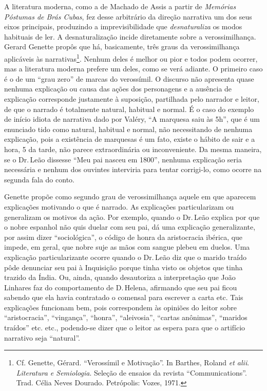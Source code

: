 A literatura moderna, como a de Machado de Assis a partir de
\emph{Memórias Póstumas de Brás Cubas}, fez desse arbitrário da direção
narrativa um dos seus eixos principais, produzindo a imprevisibilidade
que \emph{desnaturaliza} os modos habituais de ler. A desnaturalização
incide diretamente sobre a verossimilhança. Gerard Genette propôs que
há, basicamente, três graus da verossimilhança aplicáveis às
narrativas\footnote{Cf. Genette, Gérard. ``Verossímil e Motivação''. In
  Barthes, Roland \emph{et alii}. \emph{Literatura e Semiologia}.
  Seleção de ensaios da revista ``Communications''. Trad. Célia Neves
  Dourado. Petrópolis: Vozes, 1971.}. Nenhum deles é melhor ou pior e
todos podem ocorrer, mas a literatura moderna prefere um deles, como se
verá adiante. O primeiro caso é o de um ``grau zero'' de marcas do
verossímil. O discurso não apresenta quase nenhuma explicação ou causa
das ações dos personagens e a ausência de explicação corresponde
justamente à suposição, partilhada pelo narrador e leitor, de que o
narrado é totalmente natural, habitual e normal. É o caso do exemplo de
início idiota de narrativa dado por Valéry, ``A marquesa saiu às 5h'',
que é um enunciado tido como natural, habitual e normal, não
necessitando de nenhuma explicação, pois a existência de marquesas é um
fato, existe o hábito de sair e a hora, 5 da tarde, não parece
extraordinária ou inconveniente. Da mesma maneira, se o Dr.\,Leão
dissesse ``Meu pai nasceu em 1800'', nenhuma explicação seria necessária e
nenhum dos ouvintes interviria para tentar corrigi-lo, como ocorre na
segunda fala do conto.

Genette propõe como segundo grau de verossimilhança aquele em que
aparecem explicações motivando o que é narrado. As explicações
particularizam ou generalizam os motivos da ação. Por exemplo, quando o
Dr.\,Leão explica por que o nobre espanhol não quis duelar com seu pai,
dá uma explicação generalizante, por assim dizer ``sociológica'', o
código de honra da aristocracia ibérica, que impede, em geral, que nobre
suje as mãos com sangue plebeu em duelos. Uma explicação
particularizante ocorre quando o Dr.\,Leão diz que o marido traído pôde
denunciar seu pai à Inquisição porque tinha visto os objetos que tinha
trazido da Índia. Ou, ainda, quando desautoriza a interpretação que João
Linhares faz do comportamento de D.\,Helena, afirmando que seu pai ficou
sabendo que ela havia contratado o comensal para escrever a carta etc.
Tais explicações funcionam bem, pois correspondem às opiniões do leitor
sobre ``aristocracia'', ``vingança'', ``honra'', ``aleivosia'', ``cartas
anônimas'', ``maridos traídos'' etc. etc., podendo-se dizer que o leitor as
espera para que o artifício narrativo seja ``natural''.

